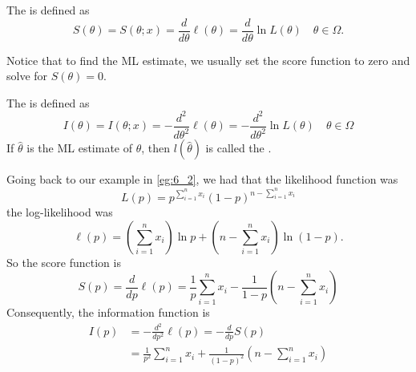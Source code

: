 \documentclass[notoc,notitlepage]{tufte-book}
\begin{document}
\begin{defn}
\label{defn:score_function}
  The  is defined as
  \begin{equation*}
    S(\theta) = S(\theta; x) = \frac{d}{d\theta}\ell(\theta) = \frac{d}{d\theta} \ln L(\theta) \quad \theta \in \Omega.
  \end{equation*}
\end{defn}

\begin{note}
  Notice that to find the ML estimate, we usually set the score function to zero and solve for $S(\theta) = 0$.
\end{note}

\begin{defn}
\label{defn:information_function}
  The  is defined as
  \begin{equation*}
    I(\theta) = I(\theta ; x) = - \frac{d^2}{d\theta^2} \ell(\theta) = - \frac{d^2}{d\theta^2} \ln L(\theta) \quad \theta \in \Omega
  \end{equation*}
  If $\hat{\theta}$ is the ML estimate of $\theta$, then $l(\hat{\theta})$ is called the .
\end{defn}

\begin{eg}\label{eg:6_2_sub1}
  Going back to our example in \cref{eg:6_2}, we had that the likelihood function was
  \begin{equation*}
    L(p) = p^{\sum\limits_{i=1}^{n} x_i} (1 - p)^{n - \sum\limits_{i=1}^{n} x_i}
  \end{equation*}
  the log-likelihood was
  \begin{equation*}
    \ell(p) = \left( \sum_{i=1}^{n} x_i \right) \ln p + \left( n - \sum_{i=1}^{n} x_i \right) \ln (1 - p).
  \end{equation*}
  So the score function is
  \begin{equation*}
    S(p) = \frac{d}{dp} \ell(p) = \frac{1}{p} \sum_{i=1}^{n} x_i - \frac{1}{1 - p} \left( n - \sum_{i=1}^{n} x_i \right)
  \end{equation*}
  Consequently, the information function is
  \begin{align*}
    I(p) &= - \frac{d^2}{dp^2} \ell(p) = - \frac{d}{dp} S(p) \\
         &= \frac{1}{p^2} \sum_{i=1}^{n} x_i + \frac{1}{(1 - p)^2} \left( n - \sum_{i=1}^{n} x_i \right)
  \end{align*}
\end{eg}
\end{document}

